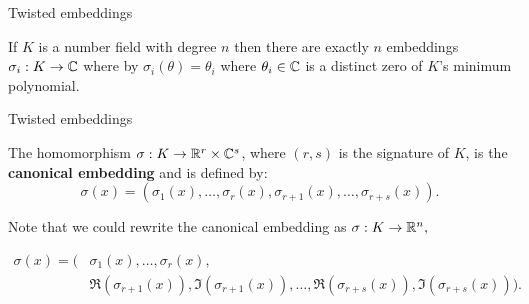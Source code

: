 \documentclass[notheorems, bigger]{beamer}
\begin{document}
\begin{frame}[label={sec:org32d2538}]{Twisted embeddings}
\begin{theorem}
  If $K$ is a number field with degree $n$ then there are
  exactly $n$ embeddings $\sigma_i : K \rightarrow \mathbb{C}$ where by $\sigma_i(\theta) =
  \theta_i$ where $\theta_i \in \mathbb{C}$ is a distinct zero of $K$'s
  minimum polynomial.
\end{theorem}
\end{frame}

\begin{frame}[label={sec:orge029132}]{Twisted embeddings}
\begin{text}
  The homomorphism $\sigma: K \rightarrow \mathbb{R}^r \times \mathbb{C}^s$, where $(r,s)$ is the signature of $K$, is the \textbf{canonical embedding} and is defined by:
  \[
  \sigma(x) = \left(\sigma_1(x), \ldots , \sigma_r(x), \sigma_{r+1}(x), \ldots, \sigma_{r+s}(x) \right).
\]

  Note that we could rewrite the canonical embedding as $\sigma : K \rightarrow \mathbb{R}^n,$

  \begin{align*}
    \sigma(x) = (& \sigma_1(x), \ldots , \sigma_r(x), \\
            & \Re(\sigma_{r+1}(x)), \Im(\sigma_{r+1}(x)), \ldots, \Re(\sigma_{r+s}(x)), \Im(\sigma_{r+s}(x)) ).
  \end{align*}

\end{text}
\end{frame}
\end{document}
